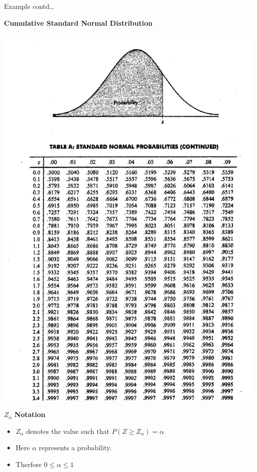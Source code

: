 \documentclass[]{book}
\providecommand{\tightlist}{%
  \setlength{\itemsep}{0pt}\setlength{\parskip}{0pt}}
\begin{document}
\newpage

Example contd\ldots{}

\newpage

\textbf{Cumulative Standard Normal Distribution}

\begin{center}\includegraphics[width=1\linewidth]{figure/ztable} \end{center}

\newpage

\(Z_\alpha\) \textbf{Notation}

\begin{itemize}
\tightlist
\item
  \(Z_\alpha\) denotes the value such that \(P(Z\geq Z_\alpha) = \alpha\)
\item
  Here \(\alpha\) represents a probability.
\item
  Therfore \(0\leq \alpha \leq 1\)
\end{itemize}
\end{document}
